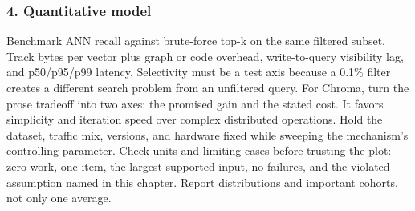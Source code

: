 \subsubsection*{4. Quantitative model}
Benchmark ANN recall against brute-force top-k on the same filtered subset. Track bytes per vector plus graph or code overhead, write-to-query visibility lag, and p50/p95/p99 latency. Selectivity must be a test axis because a 0.1\% filter creates a different search problem from an unfiltered query.
For Chroma, turn the prose tradeoff into two axes: the promised gain and the stated cost. It favors simplicity and iteration speed over complex distributed operations. Hold the dataset, traffic mix, versions, and hardware fixed while sweeping the mechanism's controlling parameter.
Check units and limiting cases before trusting the plot: zero work, one item, the largest supported input, no failures, and the violated assumption named in this chapter. Report distributions and important cohorts, not only one average.
